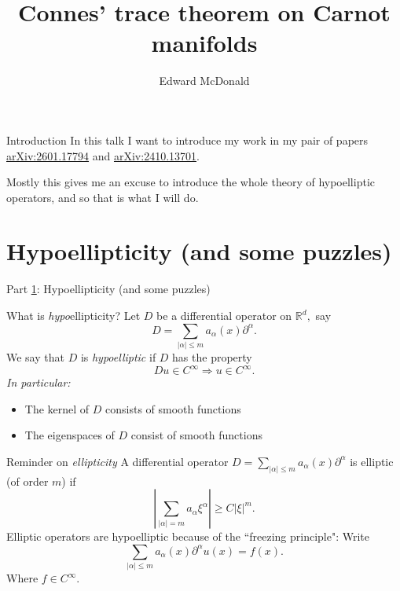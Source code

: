 \documentclass{beamer}
\newcommand\makebeamertitle{\frame{\maketitle}}%
\numberwithin{equation}{section}
\theoremstyle{plain}
\theoremstyle{plain}
\theoremstyle{definition}
\theoremstyle{plain}
\theoremstyle{plain}
\theoremstyle{definition}
\newcommand{\Rl}{\mathbb{R}}
\begin{document}
\title[CTT for Carnot]{Connes' trace theorem on Carnot manifolds}


\author[E. McDonald]{Edward McDonald}



\makebeamertitle

\begin{frame}{Introduction}
In this talk I want to introduce my work in my pair of papers \href{https://arxiv.org/abs/2601.17794}{arXiv:2601.17794} and \href{https://arxiv.org/abs/2410.13701}{arXiv:2410.13701}.

Mostly this gives me an excuse to introduce the whole theory of hypoelliptic operators, and so that is what I will do.
\end{frame}

\section{Hypoellipticity (and some puzzles)}\label{Intro}

\begin{frame}
    \huge{Part \ref{Intro}: Hypoellipticity (and some puzzles)}
\end{frame}

\begin{frame}{What is \emph{hypo}ellipticity?}
    Let $D$ be a differential operator on $\Rl^d,$ say
    \[
        D = \sum_{|\alpha|\leq m} a_{\alpha}(x)\partial^{\alpha}.
    \]
    We say that $D$ is \emph{hypoelliptic} if $D$ has the property
    \[
        Du\in C^{\infty} \Longrightarrow u \in C^{\infty}.
    \]
    \pause
    \emph{In particular:}
    \begin{itemize}
        \item{} The kernel of $D$ consists of smooth functions
        \item{} The eigenspaces of $D$ consist of smooth functions
    \end{itemize}
\end{frame}

\begin{frame}{Reminder on \emph{ellipticity}}
    A differential operator $D=\sum_{|\alpha|\leq m} a_{\alpha}(x)\partial^{\alpha}$ is elliptic (of order $m$) if
    \[
        \left|\sum_{|\alpha|=m} a_{\alpha}\xi^{\alpha}\right| \geq C|\xi|^{m}.
    \]
    \pause
    Elliptic operators are hypoelliptic because of the ``freezing principle": Write
    \[
        \sum_{|\alpha|\leq m}a_{\alpha}(x)\partial^{\alpha}u(x) = f(x).
    \]
    Where $f \in C^{\infty}.$
\end{frame}
\end{document}
